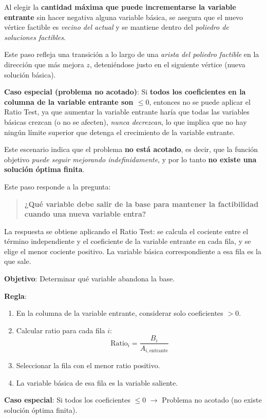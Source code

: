 Al elegir la \textbf{cantidad máxima que puede incrementarse la variable
entrante} sin hacer negativa alguna variable básica, se asegura que el nuevo
vértice factible es \emph{vecino del actual} y se mantiene dentro del
\emph{poliedro de soluciones factibles}.

Este paso refleja una transición a lo largo de una \emph{arista del poliedro
factible} en la dirección que más mejora \(z\), deteniéndose justo en el
siguiente vértice (nueva solución básica).

\textbf{Caso especial (problema no acotado)}: Si \textbf{todos los coeficientes en la columna de la variable entrante son
\(\leq 0\)}, entonces no se puede aplicar el Ratio Test, ya que aumentar la variable entrante haría que todas las variables básicas crezcan (o no se afecten), \emph{nunca decrezcan}, lo que implica que no hay ningún límite superior que detenga el crecimiento de la variable entrante.

Este escenario indica que el problema \textbf{no está acotado}, es decir, que la
función objetivo \emph{puede seguir mejorando indefinidamente}, y por lo tanto
\textbf{no existe una solución óptima finita}.

Este paso responde a la pregunta:
\begin{quote}
  \textbf{¿Qué variable debe salir de la base para mantener la factibilidad cuando
  una nueva variable entra?}
\end{quote}

La respuesta se obtiene aplicando el Ratio Test: se calcula el cociente entre
el término independiente y el coeficiente de la variable entrante en cada fila,
y se elige el menor cociente positivo. La variable básica correspondiente a
esa fila es la que sale.

\begin{tcolorbox}[title=Resumen del paso 3]
  \noindent \textbf{Objetivo}: Determinar qué variable abandona la base.
  
  \noindent \textbf{Regla}:
  \begin{enumerate}
    \item En la columna de la variable entrante, considerar solo coeficientes \(> 0\).
    \item Calcular ratio para cada fila \(i\):
     \[
     \text{Ratio}_i = \frac{B_i}{A_{i,\text{entrante}}}
     \]
    \item Seleccionar la fila con el menor ratio positivo.
    \item La variable básica de esa fila es la variable saliente.
  \end{enumerate}
  
  \noindent \textbf{Caso especial}: Si todos los coeficientes \(\leq 0\) \(\rightarrow\) Problema no acotado (no existe solución óptima finita).
\end{tcolorbox}

